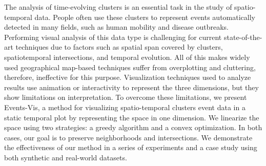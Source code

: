 The analysis of time-evolving clusters is an essential task in the study of spatio-temporal data.
People often use these clusters to represent events automatically detected in many fields, such as human mobility and disease outbreaks.
%
Performing visual analysis of this data type is challenging for current state-of-the-art techniques due to factors such as spatial span covered by clusters, spatiotemporal intersections, and temporal evolution.
%
All of this makes widely used geographical map-based techniques suffer from overplotting and cluttering, therefore, ineffective for this purpose.
%
Visualization techniques used to analyze results use animation or interactivity to represent the three dimensions, but they show limitations on interpretation.
%
To overcome these limitations, we present Events-Vis, a method for visualizing spatio-temporal clusters event data in a static temporal plot by representing the space in one dimension. We linearize the space using two strategies: a greedy algorithm and a convex optimization. In both cases, our goal is to preserve neighborhoods and intersections. 
%
We demonstrate the effectiveness of our method in a series of experiments and a case study using both synthetic and real-world datasets.